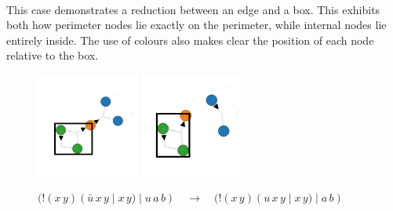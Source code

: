 \begin{examples}{~\\}
            This case demonstrates a reduction between an edge and a box.
            This exhibits both how perimeter nodes lie exactly on the perimeter, while internal nodes lie entirely inside.
            The use of colours also makes clear the position of each node relative to the box.
            \begin{figure}[H]
                \centering
                \includegraphics[width=0.3\textwidth]{diagrams/edge-box.png}
                \hspace{0.5in}
                \includegraphics[width=0.3\textwidth]{diagrams/edge-box-reduction.png}
                \caption*{$(!(x \, y)(\bar{u} \, x \, y \; | \; x \, y) \; | \; u \, a \, b) \quad \rightarrow \quad (!(x \, y)(u \, x \, y \; | \; x \, y) \; | \; a \, b)$}
            \end{figure}~\\
           

\end{examples}
